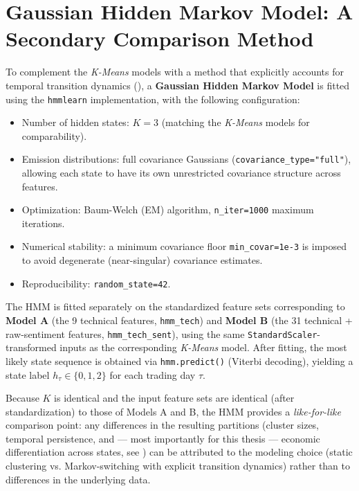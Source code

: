 \section{Gaussian Hidden Markov Model: A Secondary Comparison Method}
\label{sec:meth-hmm}

To complement the \textit{K-Means} models with a method that explicitly
accounts for temporal transition dynamics
(), a \textbf{Gaussian Hidden Markov Model} is fitted
using the \texttt{hmmlearn} implementation, with the following
configuration:

\begin{itemize}
  \item Number of hidden states: $K=3$ (matching the \textit{K-Means}
  models for comparability).
  \item Emission distributions: full covariance Gaussians
  (\texttt{covariance\_type="full"}), allowing each state to have its own
  unrestricted covariance structure across features.
  \item Optimization: Baum-Welch (EM) algorithm, \texttt{n\_iter=1000}
  maximum iterations.
  \item Numerical stability: a minimum covariance floor
  \texttt{min\_covar=1e-3} is imposed to avoid degenerate (near-singular)
  covariance estimates.
  \item Reproducibility: \texttt{random\_state=42}.
\end{itemize}

The HMM is fitted separately on the standardized feature sets
corresponding to \textbf{Model A} (the 9 technical features,
\texttt{hmm\_tech}) and \textbf{Model B} (the 31 technical + raw-sentiment
features, \texttt{hmm\_tech\_sent}), using the same
\texttt{StandardScaler}-transformed inputs as the corresponding
\textit{K-Means} model. After fitting, the most likely state sequence is
obtained via \texttt{hmm.predict()} (Viterbi decoding), yielding a state
label $h_\tau \in \{0,1,2\}$ for each trading day $\tau$.

Because $K$ is identical and the input feature sets are identical (after
standardization) to those of Models A and B, the HMM provides a
\emph{like-for-like} comparison point: any differences in the resulting
partitions (cluster sizes, temporal persistence, and --- most importantly
for this thesis --- economic differentiation across states, see
) can be attributed to the modeling choice (static
clustering vs. Markov-switching with explicit transition dynamics) rather
than to differences in the underlying data.


